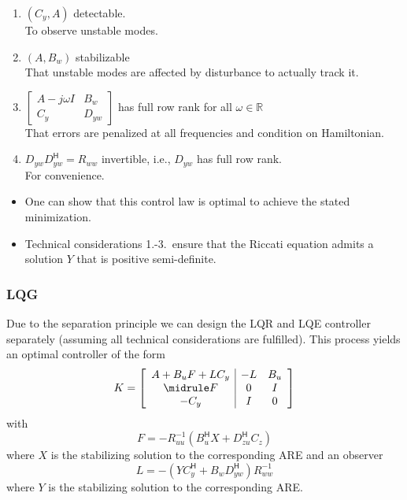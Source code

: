 \begin{enumerate}
    \item $(C_y,A)$ detectable.\\
          To observe unstable modes.
    \item $(A,B_w)$ stabilizable\\
          That unstable modes are affected by disturbance to actually track it.
    \item $\begin{bmatrix}A-j\omega I&B_w\\C_y&D_{yw}\end{bmatrix}$ has full row rank for all $\omega\in\mathbb{R}$\\
          That errors are penalized at all frequencies and condition on Hamiltonian.
    \item $D_{yw} D_{yw}^{\mathsf{H}}=R_{ww}$ invertible, i.e., $D_{yw}$ has full row rank.\\
          For convenience.
\end{enumerate}


\begin{itemize}
    \item One can show that this control law is optimal to achieve the stated minimization.
    \item Technical considerations 1.-3.\ ensure that the Riccati equation admits a solution $Y$ that is positive semi-definite.
\end{itemize}

\subsubsection{LQG}
Due to the separation principle we can design the LQR and LQE controller separately (assuming all technical considerations are fulfilled). This process yields an optimal controller of the form
\begin{equation*}   %
    K=\left[\begin{array}{c|cc}
            A+B_u F+LC_y & -L & B_u \\
            \midrule
            F            & 0  & I   \\
            -C_y         & I  & 0
        \end{array}\right]
\end{equation*}
with
\begin{equation*}
    F=-R_{uu}^{-1}(B_{u}^{\mathsf{H}}X+D_{zu}^{\mathsf{H}}C_{z})
\end{equation*}
where $X$ is the stabilizing solution to the corresponding ARE and an observer
\begin{equation*}
    L=-(YC_y^{\mathsf{H}}+B_w D_{yw}^{\mathsf{H}})R_{ww}^{-1}
\end{equation*}
where $Y$ is the stabilizing solution to the corresponding ARE.

